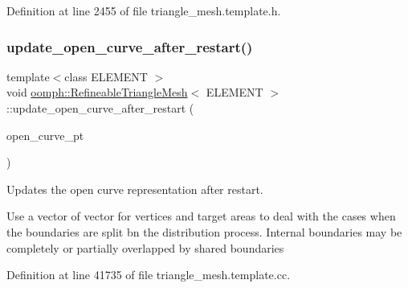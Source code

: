 Definition at line 2455 of file triangle\+\_\+mesh.\+template.\+h.

\mbox{\label{classoomph_1_1RefineableTriangleMesh_a8f136c97cfe472ca5a5a2791f490abf0}} 
\subsubsection{\texorpdfstring{update\+\_\+open\+\_\+curve\+\_\+after\+\_\+restart()}{update\_open\_curve\_after\_restart()}}
{\footnotesize\ttfamily template$<$class E\+L\+E\+M\+E\+NT $>$ \\
void \hyperlink{classoomph_1_1RefineableTriangleMesh}{oomph\+::\+Refineable\+Triangle\+Mesh}$<$ E\+L\+E\+M\+E\+NT $>$\+::update\+\_\+open\+\_\+curve\+\_\+after\+\_\+restart (\begin{DoxyParamCaption}\item[{\hyperlink{classoomph_1_1TriangleMeshOpenCurve}{Triangle\+Mesh\+Open\+Curve} $\ast$\&}]{open\+\_\+curve\+\_\+pt }\end{DoxyParamCaption})\hspace{0.3cm}{\ttfamily [protected]}}



Updates the open curve representation after restart. 

Use a vector of vector for vertices and target areas to deal with the cases when the boundaries are split bn the distribution process. Internal boundaries may be completely or partially overlapped by shared boundaries 

Definition at line 41735 of file triangle\+\_\+mesh.\+template.\+cc.



